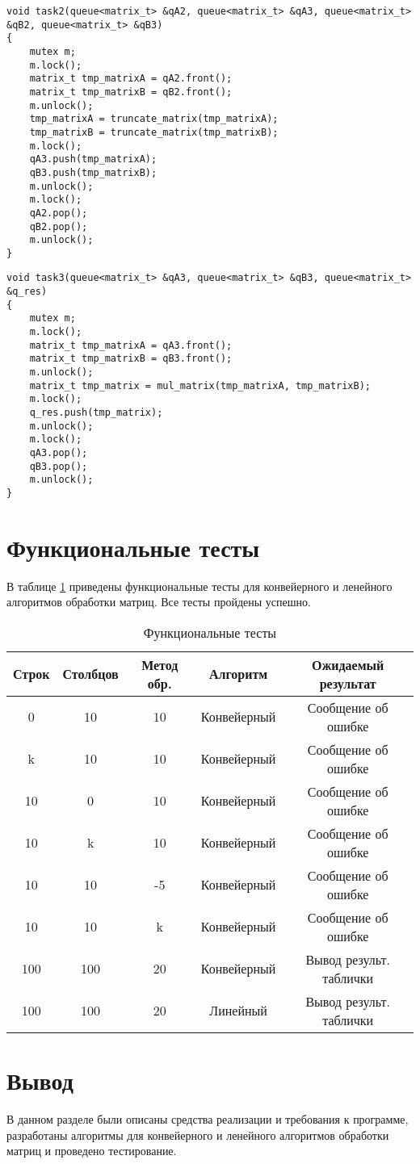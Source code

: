 \begin{lstlisting}[label=lst:stage_2,caption=Функция реализации 2-ого этапа обработки матрицы]
void task2(queue<matrix_t> &qA2, queue<matrix_t> &qA3, queue<matrix_t> &qB2, queue<matrix_t> &qB3)
{
    mutex m;
    m.lock();
    matrix_t tmp_matrixA = qA2.front();
    matrix_t tmp_matrixB = qB2.front();
    m.unlock();
    tmp_matrixA = truncate_matrix(tmp_matrixA);
    tmp_matrixB = truncate_matrix(tmp_matrixB);
    m.lock();
    qA3.push(tmp_matrixA);
    qB3.push(tmp_matrixB);
    m.unlock();
    m.lock();
    qA2.pop();
    qB2.pop();
    m.unlock();
}
\end{lstlisting}

\begin{lstlisting}[label=lst:stage_3,caption=Функция реализации 3-его этапа обработки матрицы]
void task3(queue<matrix_t> &qA3, queue<matrix_t> &qB3, queue<matrix_t> &q_res)
{
    mutex m;
    m.lock();
    matrix_t tmp_matrixA = qA3.front();
    matrix_t tmp_matrixB = qB3.front();
    m.unlock();
    matrix_t tmp_matrix = mul_matrix(tmp_matrixA, tmp_matrixB);
    m.lock();
    q_res.push(tmp_matrix);
    m.unlock();
    m.lock();
    qA3.pop();
    qB3.pop();
    m.unlock();
}
\end{lstlisting}

\section{Функциональные тесты}

В таблице \ref{tbl:functional_test} приведены функциональные тесты для конвейерного и ленейного алгоритмов обработки матриц. Все тесты пройдены успешно.

\begin{table}[h]
	\begin{center}
		\captionsetup{justification=raggedright,singlelinecheck=off}
		\caption{\label{tbl:functional_test} Функциональные тесты}
		\begin{tabular}{|c|c|c|c|c|}
			\hline
			Строк & Столбцов & Метод обр. & Алгоритм & Ожидаемый результат 
			\\ \hline
			0 & 10 & 10 & Конвейерный & Сообщение об ошибке 
			\\ \hline
			k & 10 & 10 & Конвейерный & Сообщение об ошибке 
			\\ \hline
			10 & 0 & 10 & Конвейерный & Сообщение об ошибке 
			\\ \hline
			10 & k & 10 & Конвейерный & Сообщение об ошибке 
			\\ \hline
			10 & 10 & -5 & Конвейерный & Сообщение об ошибке 
			\\ \hline
			10 & 10 & k & Конвейерный & Сообщение об ошибке 
			\\ \hline
			100 & 100 & 20 & Конвейерный & Вывод результ. таблички
			\\ \hline
			100 & 100 & 20 & Линейный & Вывод результ. таблички
			\\ \hline
		\end{tabular}
	\end{center}
\end{table}

\section*{Вывод}

В данном разделе были описаны средства реализации и требования к программе, разработаны алгоритмы для конвейерного и ленейного алгоритмов обработки матриц и проведено тестирование.